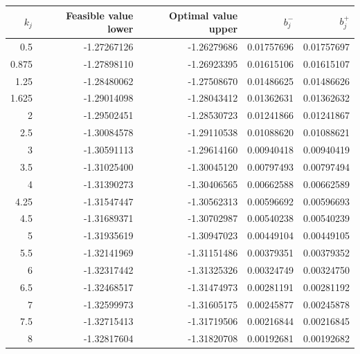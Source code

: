 \begin{tabular}{rrrrr}\toprule
$k_j$ & Feasible value lower & Optimal value upper & $b_j^-$ & $b_j^+$ \\ \midrule
0.5 & -1.27267126 & -1.26279686 & 0.01757696 & 0.01757697 \\
0.875 & -1.27898110 & -1.26923395 & 0.01615106 & 0.01615107 \\
1.25 & -1.28480062 & -1.27508670 & 0.01486625 & 0.01486626 \\
1.625 & -1.29014098 & -1.28043412 & 0.01362631 & 0.01362632 \\
2 & -1.29502451 & -1.28530723 & 0.01241866 & 0.01241867 \\
2.5 & -1.30084578 & -1.29110538 & 0.01088620 & 0.01088621 \\
3 & -1.30591113 & -1.29614160 & 0.00940418 & 0.00940419 \\
3.5 & -1.31025400 & -1.30045120 & 0.00797493 & 0.00797494 \\
4 & -1.31390273 & -1.30406565 & 0.00662588 & 0.00662589 \\
4.25 & -1.31547447 & -1.30562313 & 0.00596692 & 0.00596693 \\
4.5 & -1.31689371 & -1.30702987 & 0.00540238 & 0.00540239 \\
5 & -1.31935619 & -1.30947023 & 0.00449104 & 0.00449105 \\
5.5 & -1.32141969 & -1.31151486 & 0.00379351 & 0.00379352 \\
6 & -1.32317442 & -1.31325326 & 0.00324749 & 0.00324750 \\
6.5 & -1.32468517 & -1.31474973 & 0.00281191 & 0.00281192 \\
7 & -1.32599973 & -1.31605175 & 0.00245877 & 0.00245878 \\
7.5 & -1.32715413 & -1.31719506 & 0.00216844 & 0.00216845 \\
8 & -1.32817604 & -1.31820708 & 0.00192681 & 0.00192682 \\
\bottomrule\end{tabular}
